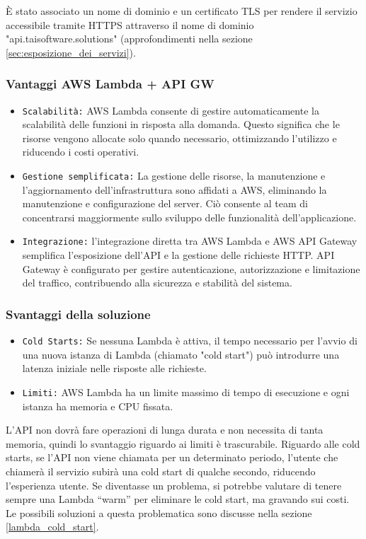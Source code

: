 È stato associato un nome di dominio e un certificato TLS per rendere il servizio accessibile tramite HTTPS attraverso il nome di dominio "api.taisoftware.solutions" (approfondimenti nella sezione \ref{sec:esposizione_dei_servizi}).


\subsubsection{Vantaggi AWS Lambda + API GW}

\begin{itemize}
    \item \texttt{Scalabilità:} AWS Lambda consente di gestire automaticamente la scalabilità delle funzioni in risposta alla domanda. Questo significa che le risorse vengono allocate solo quando necessario, ottimizzando l'utilizzo e riducendo i costi operativi.
    \item \texttt{Gestione semplificata:} La gestione delle risorse, la manutenzione e l'aggiornamento dell'infrastruttura sono affidati a AWS, eliminando la manutenzione e configurazione del server. Ciò consente al team di concentrarsi maggiormente sullo sviluppo delle funzionalità dell'applicazione.
    \item \texttt{Integrazione:} l’integrazione diretta tra AWS Lambda e AWS API Gateway semplifica l’esposizione dell’API e la gestione delle richieste HTTP. API Gateway è configurato per gestire autenticazione, autorizzazione e limitazione del traffico, contribuendo alla sicurezza e stabilità del sistema.
\end{itemize}

\subsubsection{Svantaggi della soluzione}
\begin{itemize}
    \item \texttt{Cold Starts:} Se nessuna Lambda è attiva, il tempo necessario per l'avvio di una nuova istanza di Lambda (chiamato "cold start") può introdurre una latenza iniziale nelle risposte alle richieste.
    \item \texttt{Limiti:} AWS Lambda ha un limite massimo di tempo di esecuzione e ogni istanza ha memoria e CPU fissata.
\end{itemize}

L’API non dovrà fare operazioni di lunga durata e non necessita di tanta memoria, quindi lo svantaggio riguardo ai limiti è trascurabile. Riguardo alle cold starts, se l’API non viene chiamata per un determinato periodo, l’utente che chiamerà il servizio subirà una cold start di qualche secondo, riducendo l’esperienza utente. Se diventasse un problema, si potrebbe valutare di tenere sempre una Lambda “warm” per eliminare le cold start, ma gravando sui costi. Le possibili soluzioni a questa problematica sono discusse nella sezione \ref{lambda_cold_start}.


